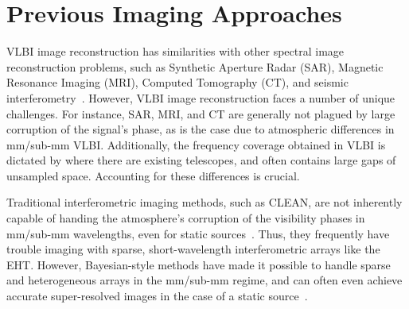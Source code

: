
\section{Previous Imaging Approaches}
\label{sec:setup}

VLBI image reconstruction has similarities with other spectral image reconstruction problems, such as Synthetic Aperture Radar (SAR), Magnetic Resonance Imaging (MRI), Computed Tomography (CT), and seismic interferometry~\cite{bracewell2004fourier, lustig2007sparse, 1456966,demanet}. 
However, VLBI image reconstruction faces a number of unique challenges.
For instance, SAR, MRI, and CT are generally not plagued by large corruption of the signal's phase, as is the case due to atmospheric differences in mm/sub-mm VLBI. Additionally, the frequency coverage obtained in VLBI is dictated by where there are existing telescopes, and often contains large gaps of unsampled space.  
Accounting for these differences is crucial.




Traditional interferometric imaging methods, such as CLEAN, are not inherently capable of handing the atmosphere's corruption of the visibility phases in mm/sub-mm wavelengths, even for static sources~\cite{hogbom1974aperture, taylor1999synthesis}. Thus, they frequently have trouble imaging with sparse, short-wavelength interferometric arrays like the EHT. 
However, Bayesian-style methods have made it possible to handle sparse and heterogeneous arrays in the mm/sub-mm regime, and can often even achieve accurate super-resolved images in the case of a static source~\cite{Narayan_Nityananda_1986, skilling1990quantified,  andrew}.


